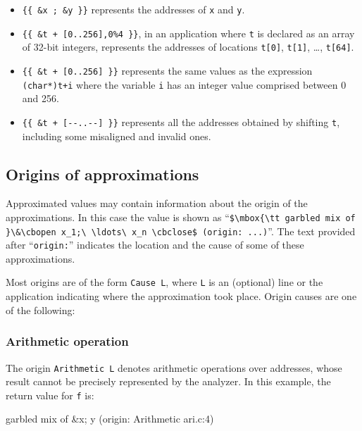 \documentclass{frama-c-book}
\newcommand{\cbopen}{\mbox{\tt \{}}
\newcommand{\cbclose}{\mbox{\tt \}}}
\begin{document}
\begin{itemize}
\item \lstinline|{{ &x ; &y }}|
      represents the addresses of \lstinline|x| and \lstinline|y|.

\item \lstinline|{{ &t + [0..256],0%4 }}|, in an application where
  \lstinline|t| is declared as an array of 32-bit integers, represents
  the addresses of locations \lstinline|t[0]|, \lstinline|t[1]|, \ldots, \lstinline|t[64]|.

\item \lstinline|{{ &t + [0..256] }}|
represents the same values as the expression \lstinline|(char*)t+i|
where the variable \lstinline|i| has an integer value comprised between 0 and 256.

\item \lstinline|{{ &t + [--..--] }}|
      represents all the addresses obtained by shifting \lstinline|t|, including
some misaligned and invalid ones.

\end{itemize}

\subsection{Origins of approximations}

Approximated values may  contain
information about the origin of the approximations.  In this
case the value is shown as ``\lstinline|$\mbox{\tt garbled mix of }\&\cbopen x_1;\ \ldots\ x_n \cbclose$ (origin: ...)|''.
The text provided after ``\lstinline|origin:|'' indicates the
location and the cause of
some of these approximations.
\goodbreak

Most origins are of the form \lstinline|Cause L|, where \lstinline|L|
is an (optional) line or the application indicating where the approximation
took place. Origin causes are one of the following:

\subsubsection{Arithmetic operation}
The origin \lstinline$Arithmetic L$ denotes arithmetic operations over
addresses, whose result cannot be precisely represented by the analyzer.
In this example, the return value for \lstinline|f| is:

\begin{logsmath}
{{ garbled mix of &{x; y} (origin: Arithmetic {ari.c:4}) }}
\end{logsmath}
\end{document}
